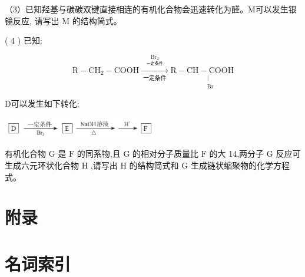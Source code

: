 \documentclass[10pt]{article}
\begin{document}
（3）已知羟基与碳碳双键直接相连的有机化合物会迅速转化为醛。M可以发生银镜反应, 请写出 M 的结构简式。

( 4 ) 已知:

\[
\mathrm{R} - {\mathrm{{CH}}}_{2} - \mathrm{{COOH}}\xrightarrow[\text{ 一定条件 }]{\underset{\text{ 一定条件 }}{{\mathrm{{Br}}}_{2}}}\mathrm{R} - \underset{\begin{matrix} | \\ \mathrm{{Br}} \end{matrix}}{\mathrm{{CH}} - \mathrm{{COOH}}}
\]

D可以发生如下转化:

\begin{center}
\includegraphics[max width=0.5\textwidth]{images/0190efc5-b58a-7c43-bfb0-e0a030df9cfd_158_244740.jpg}
\end{center}

有机化合物 \(\mathrm{G}\) 是 \(\mathrm{F}\) 的同系物,且 \(\mathrm{G}\) 的相对分子质量比 \(\mathrm{F}\) 的大 14,两分子 \(\mathrm{G}\) 反应可生成六元环状化合物 \(\mathrm{H}\) ,请写出 \(\mathrm{H}\) 的结构简式和 \(\mathrm{G}\) 生成链状缩聚物的化学方程式。

\section*{附录}

\section*{名词索引}
\end{document}
